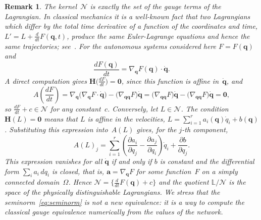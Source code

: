 \documentclass[sn-mathphys-num]{sn-jnl}
\theoremstyle{thmstylethree}
\theoremstyle{thmstyletwo}
\newtheorem{remark}{Remark}
\theoremstyle{thmstyleone}
\begin{document}
\begin{remark} \label{remark:gauge}
The kernel~$\mathcal{N}$ is exactly the set of the gauge terms of the Lagrangian. In classical mechanics it is a well-known fact that two Lagrangians which differ by the total time derivative of a function of the coordinates and time, $L' = L + \tfrac{d}{dt} F(\mathbf{q}, t)$, produce the same Euler-Lagrange equations and hence the same trajectories; see~\cite[\S 2]{LandauMechanics}. For the autonomous systems considered here $F = F(\mathbf{q})$ and
\[
\frac{d F(\mathbf{q})}{dt} = \nabla_{\mathbf{q}} F(\mathbf{q}) \cdot \dot{\mathbf{q}}.
\]
A direct computation gives $\mathbf{H}\bigl(\tfrac{d F}{dt}\bigr) = \mathbf{0}$, since this function is affine in~$\dot{\mathbf{q}}$, and
\[
A\left(\frac{d F}{dt}\right) = \nabla_{\mathbf{q}} \bigl( \nabla_{\mathbf{q}} F \cdot \dot{\mathbf{q}} \bigr) - \bigl( \nabla_{\mathbf{q}\mathbf{q}} F \bigr) \dot{\mathbf{q}} = \bigl( \nabla_{\mathbf{q}\mathbf{q}} F \bigr) \dot{\mathbf{q}} - \bigl( \nabla_{\mathbf{q}\mathbf{q}} F \bigr) \dot{\mathbf{q}} = \mathbf{0},
\]
so $\tfrac{d F}{dt} + c \in \mathcal{N}$ for any constant~$c$. Conversely, let $L \in \mathcal{N}$. The condition $\mathbf{H}(L) = \mathbf{0}$ means that $L$ is affine in the velocities, $L = \sum_{i=1}^r a_i(\mathbf{q}) \dot{q}_i + b(\mathbf{q})$. Substituting this expression into~$A(L)$ gives, for the $j$-th component,
\[
A(L)_j = \sum_{i=1}^r \left( \frac{\partial a_i}{\partial q_j} - \frac{\partial a_j}{\partial q_i} \right) \dot{q}_i + \frac{\partial b}{\partial q_j}.
\]
This expression vanishes for all $\dot{\mathbf{q}}$ if and only if $b$ is constant and the differential form $\sum_i a_i \, d q_i$ is closed, that is, $\mathbf{a} = \nabla_{\mathbf{q}} F$ for some function~$F$ on a simply connected domain~$\Omega$. Hence $\mathcal{N} = \{ \tfrac{d}{dt} F(\mathbf{q}) + c \}$ and the quotient $\mathbb{L}/\mathcal{N}$ is the space of the physically distinguishable Lagrangians. We stress that the seminorm~\eqref{eq:seminorm} is not a new equivalence: it is a way to compute the classical gauge equivalence numerically from the values of the network.
\end{remark}
\end{document}
